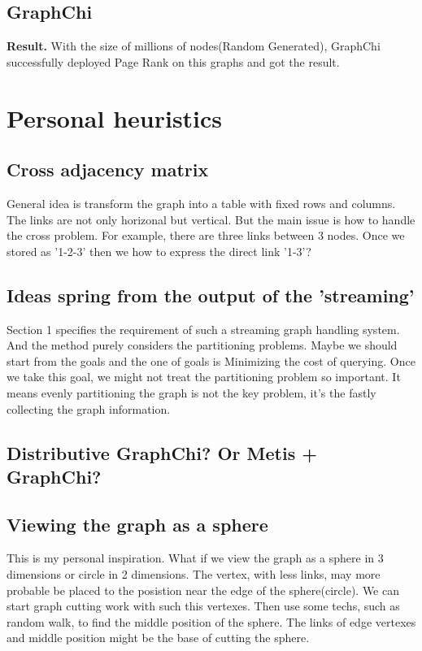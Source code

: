 \documentclass{article}
\begin{document}
	\subsection{GraphChi}
	\textbf{Result.} With the size of millions of nodes(Random Generated), GraphChi successfully deployed Page Rank\cite{pagerank} on this graphs and got the result.

	\newpage
	\section{Personal heuristics}
	\subsection{Cross adjacency matrix}
	General idea is transform the graph into a table with fixed rows and columns. The links are not only horizonal but vertical. But the main issue is how to handle the cross problem. For example, there are three links between 3 nodes. Once we stored as '1-2-3' then we how to express the direct link '1-3'?

	\subsection{Ideas spring from the output of the 'streaming'}
	Section 1 specifies the requirement of such a streaming graph handling system. And the method\cite{stanton2012streaming} purely considers the partitioning problems. Maybe we should start from the goals and the one of goals is Minimizing the cost of querying. Once we take this goal, we might not treat the partitioning problem so important. It means evenly partitioning the graph is not the key problem, it's the fastly collecting the graph information.

	\subsection{Distributive GraphChi? Or Metis + GraphChi?}

	\subsection{Viewing the graph as a sphere}
	This is my personal inspiration. What if we view the graph as a sphere in 3 dimensions or circle in 2 dimensions. The vertex, with less links, may more probable be placed to the posistion near the edge of the sphere(circle). We can start graph cutting work with such this vertexes. Then use some techs, such as random walk, to find the middle position of the sphere. The links of edge vertexes and middle position might be the base of cutting the sphere.
\end{document}
